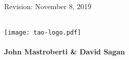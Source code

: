 \thispagestyle{empty}

\begin{flushright}
\large
Revision: November 8, 2019 \\
\end{flushright}

\vfill


{
\begin{center}
 \\
\vskip 0.2in
\texttt{[image: tao-logo.pdf]} \\
\vskip 0.3in
 \\
\vskip 0.4in
{\huge \sf\bf John Mastroberti \& David Sagan} \\
\end{center}
}

\vfill
\break
